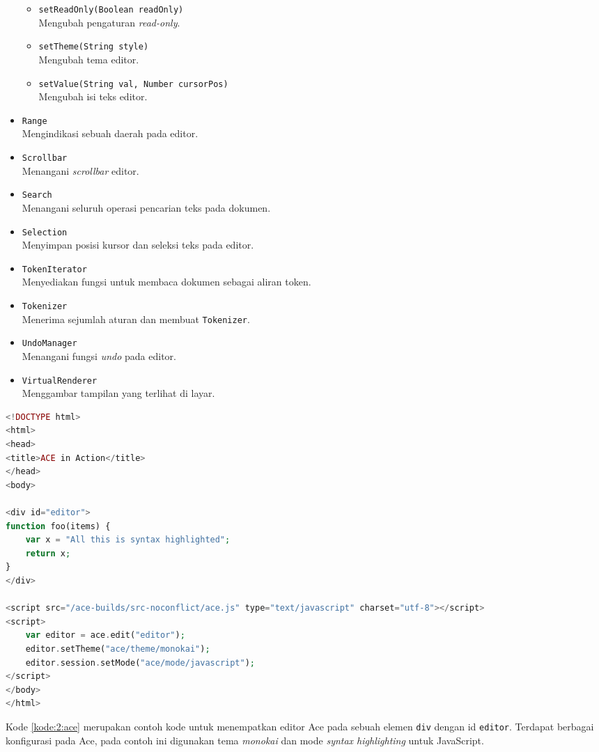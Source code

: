 \begin{itemize}
\begin{itemize}
            \item \verb|setReadOnly(Boolean readOnly)| \\ Mengubah pengaturan \textit{read-only}.
            \item \verb|setTheme(String style)| \\ Mengubah tema editor.
            \item \verb|setValue(String val, Number cursorPos)| \\ Mengubah isi teks editor.
        \end{itemize}
    \item \verb|Range| \\ Mengindikasi sebuah daerah pada editor.
    \item \verb|Scrollbar| \\ Menangani \textit{scrollbar} editor.
    \item \verb|Search| \\ Menangani seluruh operasi pencarian teks pada dokumen.
    \item \verb|Selection| \\ Menyimpan posisi kursor dan seleksi teks pada editor.
    \item \verb|TokenIterator| \\ Menyediakan fungsi untuk membaca dokumen sebagai aliran token.
    \item \verb|Tokenizer| \\ Menerima sejumlah aturan dan membuat \verb|Tokenizer|.
    \item \verb|UndoManager| \\ Menangani fungsi \textit{undo} pada editor.
    \item \verb|VirtualRenderer| \\ Menggambar tampilan yang terlihat di layar.
\end{itemize}


\begin{lstlisting}[language=php, caption=Contoh kode untuk menggunakan Ace, label=kode:2:ace]
<!DOCTYPE html>
<html>
<head>
<title>ACE in Action</title>
</head>
<body>

<div id="editor">
function foo(items) {
    var x = "All this is syntax highlighted";
    return x;
}
</div>
    
<script src="/ace-builds/src-noconflict/ace.js" type="text/javascript" charset="utf-8"></script>
<script>
    var editor = ace.edit("editor");
    editor.setTheme("ace/theme/monokai");
    editor.session.setMode("ace/mode/javascript");
</script>
</body>
</html>
\end{lstlisting} 

Kode \ref{kode:2:ace} merupakan contoh kode untuk menempatkan editor Ace pada sebuah elemen \verb|div| dengan id \verb|editor|. Terdapat berbagai konfigurasi pada Ace, pada contoh ini digunakan tema \textit{monokai} dan mode \textit{syntax highlighting} untuk JavaScript.




